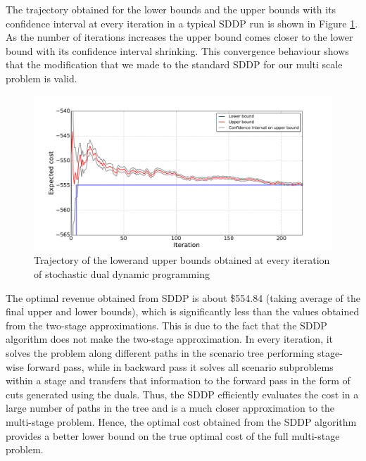 \documentclass[11pt,twoside]{article}
\begin{document}
The trajectory obtained for the lower bounds and the upper bounds with its confidence interval at every iteration in a typical SDDP run is shown in Figure \ref{fig:bounds}. As the number of iterations increases the upper bound comes closer to the lower bound with its confidence interval shrinking. This convergence behaviour shows that the modification that we made to the standard SDDP for our multi scale problem is valid. 
\begin{figure}[h!]
\begin{center}
\includegraphics[scale=0.4]
{Figures/Plots/dualdynamic/bounds.pdf} \caption{Trajectory of the lowerand upper bounds obtained at every iteration of stochastic dual dynamic programming}\label{fig:bounds}
\end{center}
\end{figure}
\FloatBarrier
The optimal revenue obtained from SDDP is about \$554.84 (taking average of the final upper and lower bounds), which is significantly less than the values obtained from the two-stage approximations. This is due to the fact that the SDDP algorithm does not make the two-stage approximation. In every iteration, it solves the problem along different paths in the scenario tree performing stage-wise forward pass, while in backward pass it solves all scenario subproblems within a stage and transfers that information to the forward pass in the form of cuts generated using the duals. Thus, the SDDP efficiently evaluates the cost in a large number of paths in the tree and is a much closer approximation to the multi-stage problem. Hence, the optimal cost obtained from the SDDP algorithm provides a better lower bound on the true optimal cost of the full multi-stage problem.
\FloatBarrier
\end{document}
